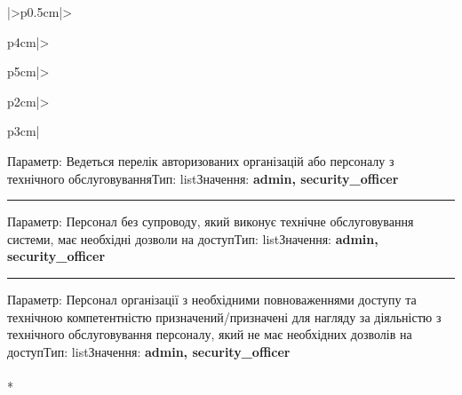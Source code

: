 \documentclass[10pt]{article}
\begin{document}
\begin{longtable}{|>{\centering\arraybackslash}p{0.5cm}|>{\raggedright\arraybackslash}p{4cm}|>{\raggedright\arraybackslash}p{5cm}|>{\raggedright\arraybackslash}p{2cm}|>{\raggedright\arraybackslash}p{3cm}|}
Параметр: Ведеться перелік авторизованих організацій або персоналу з технічного обслуговування\newline Тип: list\newline Значення: \textbf{admin, security\_\allowbreak{}officer}\vspace{1mm}\newline\noindent\rule{\linewidth}{0.4pt}\vspace{1mm}
Параметр: Персонал без супроводу, який виконує технічне обслуговування системи, має необхідні дозволи на доступ\newline Тип: list\newline Значення: \textbf{admin, security\_\allowbreak{}officer}\vspace{1mm}\newline\noindent\rule{\linewidth}{0.4pt}\vspace{1mm}
Параметр: Персонал організації з необхідними повноваженнями доступу та технічною компетентністю призначений/призначені для нагляду за діяльністю з технічного обслуговування персоналу, який не має необхідних дозволів на доступ\newline Тип: list\newline Значення: \textbf{admin, security\_\allowbreak{}officer} \\ \hline
{} \\* 

\end{longtable}
\end{document}
